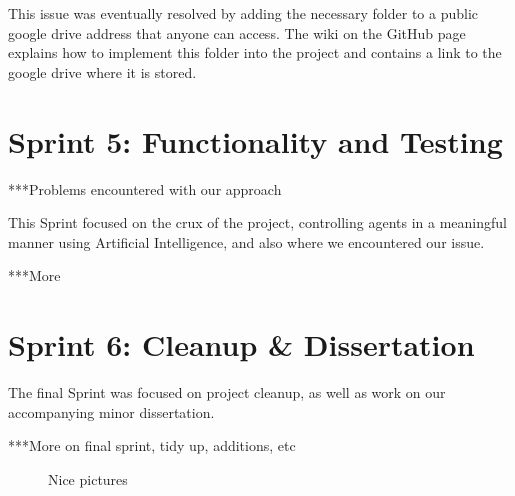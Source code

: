 	This issue was eventually resolved by adding the necessary folder to a public google drive address that anyone can access. The wiki on the GitHub page explains how to implement this folder into the project and contains a link to the google drive where it is stored.

\section{Sprint 5: Functionality and Testing}
	***Problems encountered with our approach
	
	This Sprint focused on the crux of the project, controlling agents in a meaningful manner using Artificial Intelligence, and also where we encountered our issue.
	
	***More

\section{Sprint 6: Cleanup \& Dissertation} 

	The final Sprint was focused on project cleanup, as well as work on our accompanying minor dissertation.
	
	***More on final sprint, tidy up, additions, etc



\begin{figure}
  \centering
  \caption{Nice pictures}
  \label{tikz:graphs}
\end{figure}